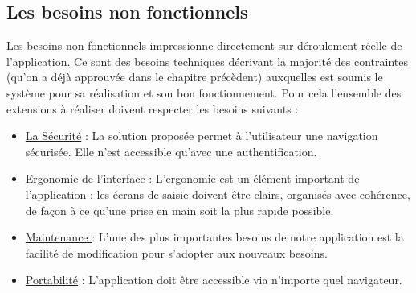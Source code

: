 \subsection{Les besoins non fonctionnels}
Les besoins non fonctionnels impressionne directement sur déroulement réelle de l’application. Ce sont des besoins techniques décrivant la majorité des contraintes (qu’on a déjà
approuvée dans le chapitre précèdent) auxquelles est soumis le système pour sa réalisation et
son bon fonctionnement. Pour cela l’ensemble des extensions à réaliser doivent respecter les besoins suivants :

\begin{itemize}
	\item \underline{La Sécurité} : La solution proposée permet à l’utilisateur une navigation sécurisée.
	Elle n’est accessible qu’avec une authentification.
	\item \underline{Ergonomie de l’interface }: L’ergonomie est un élément important de l’application : les
	écrans de saisie doivent être clairs, organisés avec cohérence, de façon à ce qu’une prise
	en main soit la plus rapide possible.
	\item \underline{
Maintenance }: L’une des plus importantes besoins de notre application est la facilité de
	modification pour s’adopter aux nouveaux besoins.
	\item \underline{Portabilité} : L’application doit être accessible via n’importe quel navigateur.

\end{itemize}

